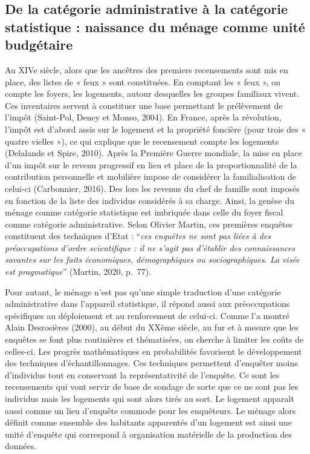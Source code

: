 \documentclass[
  12pt,
]{book}
\begin{document}
\subsection{De la catégorie administrative à la catégorie statistique :
naissance du ménage comme unité
budgétaire}\label{de-la-catuxe9gorie-administrative-uxe0-la-catuxe9gorie-statistique-naissance-du-muxe9nage-comme-unituxe9-budguxe9taire}

Au XIVe siècle, alors que les ancêtres des premiers recensements sont
mis en place, des listes de « feux » sont constituées. En comptant les «
feux », on compte les foyers, les logements, autour desquelles les
groupes familiaux vivent. Ces inventaires servent à constituer une base
permettant le prélèvement de l'impôt (Saint-Pol, Deney et Monso, 2004).
En France, après la révolution, l'impôt est d'abord assis sur le
logement et la propriété foncière (pour trois des « quatre vielles »),
ce qui explique que le recensement compte les logements (Delalande et
Spire, 2010). Après la Première Guerre mondiale, la mise en place d'un
impôt sur le revenu progressif en lieu et place de la proportionnalité
de la contribution personnelle et mobilière impose de considérer la
familialisation de celui-ci (Carbonnier, 2016). Des lors les revenus du
chef de famille sont imposés en fonction de la liste des individus
considérés à sa charge. Ainsi, la genèse du ménage comme catégorie
statistique est imbriquée dans celle du foyer fiscal comme catégorie
administrative. Selon Olivier Martin, ces premières enquêtes constituent
des techniques d'Etat : ``\emph{ces enquêtes ne sont pas liées à des
préoccupations d'ordre scientifique : il ne s'agit pas d'établir des
connaissances savantes sur les faits économiques, démographiques ou
sociographiques. La visée est pragmatique}'' (Martin, 2020, p.~77).

Pour autant, le ménage n'est pas qu'une simple traduction d'une
catégorie administrative dans l'appareil statistique, il répond aussi
aux préoccupations spécifiques au déploiement et au renforcement de
celui-ci. Comme l'a montré Alain Desrosières (2000), au début du XXème
siècle, au fur et à mesure que les enquêtes se font plus routinières et
thématisées, on cherche à limiter les coûts de celles-ci. Les progrès
mathématiques en probabilités favorisent le développement des techniques
d'échantillonnages. Ces techniques permettent d'enquêter moins
d'individus tout en conservant la représentativité de l'enquête. Ce sont
les recensements qui vont servir de base de sondage de sorte que ce ne
sont pas les individus mais les logements qui sont alors tirés au sort.
Le logement apparaît aussi comme un lieu d'enquête commode pour les
enquêteurs. Le ménage alors définit comme ensemble des habitants
apparentés d'un logement est ainsi une unité d'enquête qui correspond à
organisation matérielle de la production des données.
\end{document}
